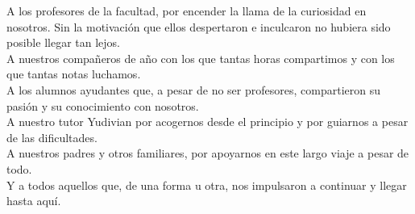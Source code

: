\begin{acknowledgements}
	A los profesores de la facultad, por encender la llama de la curiosidad en nosotros. Sin la motivación
	que ellos despertaron e inculcaron no hubiera sido posible llegar tan lejos.\\

	A nuestros compañeros de año con los que tantas horas compartimos y con los que tantas notas luchamos.\\


	A los alumnos ayudantes que, a pesar de no ser profesores, compartieron su pasión y su conocimiento con 
	nosotros.\\

	A nuestro tutor Yudivian por acogernos desde el principio y por guiarnos a pesar de las dificultades.\\


	A nuestros padres y otros familiares, por apoyarnos en este largo viaje a pesar de todo.\\


	Y a todos aquellos que, de una forma u otra, nos impulsaron a continuar y llegar hasta aquí.
\end{acknowledgements}
